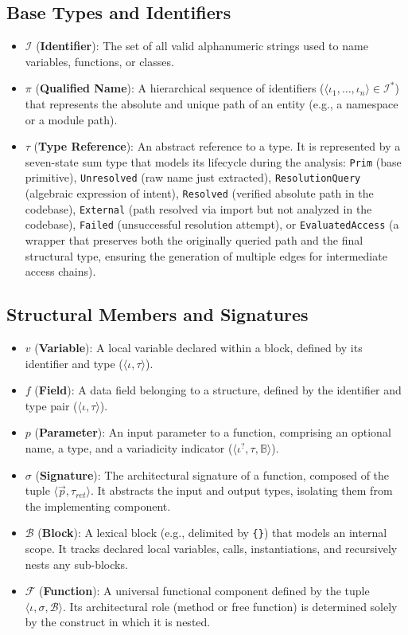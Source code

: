 \subsection{Base Types and Identifiers}
\begin{itemize}
    \item $\mathcal{I}$ (\textbf{Identifier}): The set of all valid alphanumeric strings used to name variables, functions, or classes.
    \item $\pi$ (\textbf{Qualified Name}): A hierarchical sequence of identifiers ($\langle \iota_1, \dots, \iota_n \rangle \in \mathcal{I}^*$) that represents the absolute and unique path of an entity (e.g., a namespace or a module path).
    \item $\tau$ (\textbf{Type Reference}): An abstract reference to a type. It is represented by a seven-state sum type that models its lifecycle during the analysis: \texttt{Prim} (base primitive), \texttt{Unresolved} (raw name just extracted), \texttt{ResolutionQuery} (algebraic expression of intent), \texttt{Resolved} (verified absolute path in the codebase), \texttt{External} (path resolved via import but not analyzed in the codebase), \texttt{Failed} (unsuccessful resolution attempt), or \texttt{EvaluatedAccess} (a wrapper that preserves both the originally queried path and the final structural type, ensuring the generation of multiple edges for intermediate access chains).
\end{itemize}

\subsection{Structural Members and Signatures}
\begin{itemize}
    \item $v$ (\textbf{Variable}): A local variable declared within a block, defined by its identifier and type ($\langle \iota, \tau \rangle$).
    \item $f$ (\textbf{Field}): A data field belonging to a structure, defined by the identifier and type pair ($\langle \iota, \tau \rangle$).
    \item $p$ (\textbf{Parameter}): An input parameter to a function, comprising an optional name, a type, and a variadicity indicator ($\langle \iota^?, \tau, \mathbb{B} \rangle$).
    \item $\sigma$ (\textbf{Signature}): The architectural signature of a function, composed of the tuple $\langle \vec{p}, \tau_{ret} \rangle$. It abstracts the input and output types, isolating them from the implementing component.
    \item $\mathcal{B}$ (\textbf{Block}): A lexical block (e.g., delimited by \texttt{\{\}}) that models an internal scope. It tracks declared local variables, calls, instantiations, and recursively nests any sub-blocks.
    \item $\mathcal{F}$ (\textbf{Function}): A universal functional component defined by the tuple $\langle \iota, \sigma, \mathcal{B} \rangle$. Its architectural role (method or free function) is determined solely by the construct in which it is nested.
\end{itemize}

